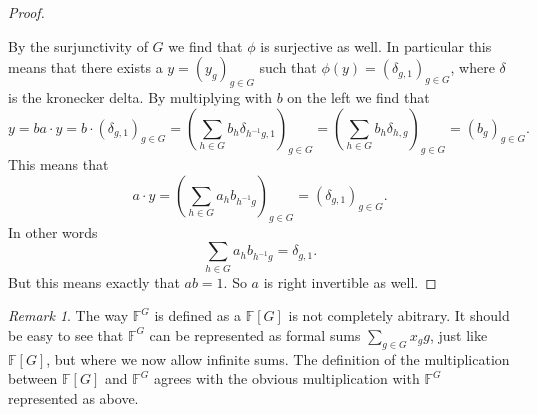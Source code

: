 \documentclass[titlepage, a4paper]{article}
\newcommand{\F}{\mathbb{F}}
\theoremstyle{remark}
\newtheorem{remark}{Remark}
\begin{document}
\begin{proof}
\begin{itemize}
				
		\end{itemize}
		By the surjunctivity of $G$ we find that $\phi$ is surjective as well. In particular this means that there exists a $y = (y_g)_{g \in G}$ such that $\phi(y) = (\delta_{g, 1})_{g \in G}$, where $\delta$ is the kronecker delta.
		By multiplying with $b$ on the left we find that \[
			 y = ba\cdot y = b\cdot (\delta_{g, 1})_{g \in G} = \left( \sum_{h \in G} b_{h} \delta_{h^{-1}g, 1} \right)_{g \in G} = \left( \sum_{h \in G} b_{h} \delta_{h, g} \right)_{g \in G}
		 = \left( b_{g} \right) _{g \in G}.\] 
		This means that \[
		a\cdot y = \left( \sum_{h \in G} a_h b_{h^{-1}g} \right)_{g \in G} = \left( \delta_{g, 1} \right) _{g \in G} 
	.\] 
	In other words
	\[
	\sum_{h \in G} a_h b_{h^{-1}g} = \delta_{g, 1}
	.\]
	But this means exactly that $ab = 1$. So  $a$ is right invertible as well. 
	\end{proof}	
	\begin{remark}
		The way $\F^{G}$ is defined as a $\F[G]$ is not completely abitrary. It should be easy to see that  $\F^{G}$ can be represented as formal sums $\sum_{g \in G} x_g g$, just like $\F[G]$, but where we now allow infinite sums. 
		The definition of the multiplication between  $\F[G]$ and  $\F^{G}$ agrees with the obvious multiplication with $\F^{G}$ represented as above. 
	\end{remark}
	\printbibliography
\end{document}
